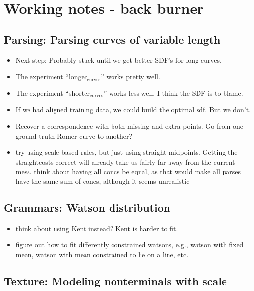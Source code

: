 \documentclass{book}
\begin{document}
\chapter{Working notes - back burner}
\label{sec-4}
\section{Parsing: Parsing curves of variable length}
\label{sec-4_1}

\begin{itemize}
\item Next step: Probably stuck until we get better SDF's for long curves.
\item The experiment ``longer$_{\mathrm{curves}}$'' works pretty well.
\item The experiment ``shorter$_{\mathrm{curves}}$'' works less well.  I think the SDF
    is to blame.
\item If we had aligned training data, we could build the optimal
    sdf. But we don't.
\item Recover a correspondence with both missing and extra points. Go
    from one ground-truth Romer curve to another?
\item try using scale-based rules, but just using straight
    midpoints. Getting the straightcosts correct will already take us
    fairly far away from the current mess. think about having all
    concs be equal, as that would make all parses have the same sum of
    concs, although it seems unrealistic
\end{itemize}
\section{Grammars: Watson distribution}
\label{sec-4_2}

\begin{itemize}
\item think about using Kent instead? Kent is harder to fit.
\item figure out how to fit differently constrained watsons, e.g.,
    watson with fixed mean, watson with mean constrained to lie on a
    line, etc.
\end{itemize}
\section{Texture: Modeling nonterminals with scale}
\label{sec-4_3}
\end{document}
